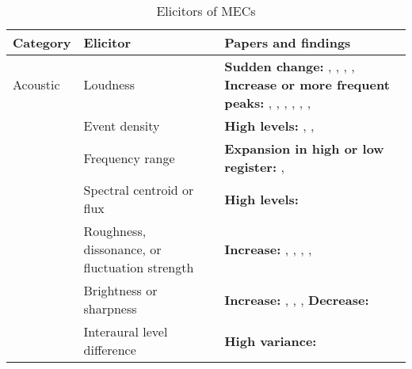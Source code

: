 \begin{table}[t!]
\centering
\scriptsize
\def\arraystretch{1.2}

\begin{threeparttable}
\caption{Elicitors of MECs}
\label{tab:rev-5}

\begin{tabular*}{\textwidth}{
    >{\raggedright}p{}
    >{\raggedright}p{}
    >{\raggedright\arraybackslash}p{}}

\hline

\textbf{Category} & \textbf{Elicitor} & \textbf{Papers and findings} \\ 

\hline
Acoustic & Loudness & 
    \textbf{Sudden change:} \textcite{auricchio2017}, \textcite{guhn2007}, \textcite{nagel2008}, \textcite{polo2017}, \textcite{sloboda1991} 
    \newline 
    \textbf{Increase or more frequent peaks:} \textcite{bannister2018}, \textcite{bannister2020b}, \textcite{beier2020}, \textcite{grewe2007}, \textcite{guhn2007}, \textcite{honda2020}, \textcite{nagel2008} \\ 

\cline{2-3}   
& Event density & 
    \textbf{High levels:} \textcite{bannister2018}, \textcite{nagel2008}, \textcite{polo2017} \\

\cline{2-3}
& Frequency range & 
    \textbf{Expansion in high or low register:} \textcite{guhn2007}, \textcite{polo2017} \\
    
\cline{2-3}
& Spectral centroid or flux & 
    \textbf{High levels:} \textcite{bannister2018} \\
    
\cline{2-3}
& Roughness, dissonance, or fluctuation strength & 
    \textbf{Increase:} \textcite{bannister2018}, \textcite{beier2020}, \textcite{grewe2007}, \textcite{nagel2008}, \textcite{park2019} \\
    
\cline{2-3}
& Brightness or sharpness & 
    \textbf{Increase:} \textcite{bannister2018}, \textcite{beier2020}, \textcite{grewe2007}, \textcite{honda2020} 
    \newline 
    \textbf{Decrease:} \textcite{bannister2020b} \\
    
\cline{2-3}
& Interaural level difference & 
    \textbf{High variance:} \textcite{honda2020} \\


\end{tabular*}
\end{threeparttable}
\end{table}
